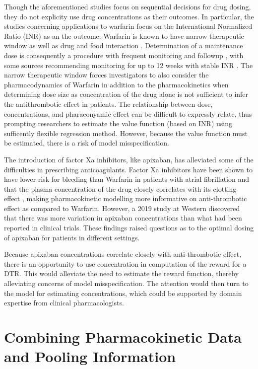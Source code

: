 Though the aforementioned studies focus on sequential decisions for drug dosing, they do not explicity use drug concentrations as their outcomes. In particular, the studies concerning applications to warfarin focus on the International Normalized Ratio (INR) as an the outcome. Warfarin is known to have narrow therapeutic window \cite{merli2009warfarin} as well as drug and food interaction \cite{juurlink2007drug}. Determination of a maintenance dose is consequently a procedure with frequent monitoring and followup \cite{carris2015feasibility}, with some sources recommending monitoring for up to 12 weeks with stable INR \cite{holbrook2012evidence}. The narrow therapeutic window forces investigators to also consider the pharmacodynamics of Warfarin in addition to the pharmacokinetics when determining dose size as concentration of the drug alone is not sufficient to infer the antithrombotic effect in patients. The relationship between dose, concentrations, and pharaconyamic effect can be difficult to expressly relate, thus prompting researchers to estimate the value function (based on INR) using sufficently flexible regression method. However, because the value function must be estimated, there is a risk of model misspecification.

The introduction of factor Xa inhibitors, like apixaban, has alleviated some of the difficulties in prescribing anticoagulants. Factor Xa inhibitors have been shown to have lower risk for bleeding than Warfarin in patients with atrial fibrillation \cite{touma2015meta} and that the plasma concentration of the drug closely correlates with its clotting effect \cite{Byon2019-gf}, making pharmacokinetic modelling more informative on anti-thrombotic effect as compared to Warfarin. However, a 2019 study at Western \cite{sukumar2019apixaban} discovered that there was more variation in apixaban concentrations than what had been reported in clinical trials.  These findings raised questions as to the optimal dosing of apixaban for patients in different settings.

Because apixaban concentrations correlate closely with anti-thrombotic effect, there is an opportunity to use concentration in computation of the reward for a DTR.  This would alleviate the need to estimate the reward function, thereby alleviating concerns of model misspecification.  The attention would then turn to the model for estimating concentrations, which could be supported by domain expertise from clinical pharmacologists.

\section{Combining Pharmacokinetic Data and Pooling Information}

